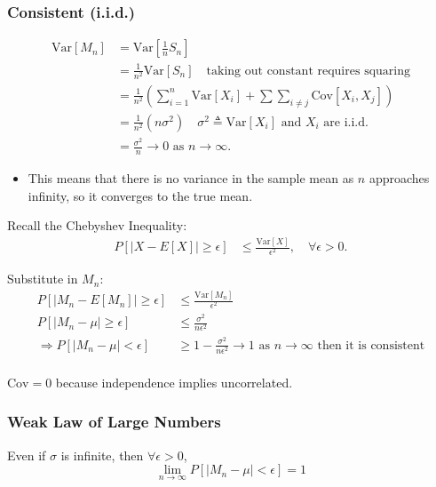 \subsubsection{Consistent (i.i.d.)}
\begin{derivation}
    \begin{align*}
        \text{Var}[M_n] &= \text{Var}\left[\frac{1}{n} S_n\right] \\
        &= \frac{1}{n^2} \text{Var}[S_n] \quad \text{taking out constant requires squaring}\\
        &= \frac{1}{n^2} \left(\sum_{i=1}^n \text{Var}[X_i] + \sum \sum_{i \neq j} \text{Cov}[X_i, X_j]\right) \\
        &= \frac{1}{n^2} (n \sigma^2) \quad \sigma^2 \triangleq \text{Var}[X_i] \text{ and $X_i$ are i.i.d.} \\
        &= \frac{\sigma^2}{n} \to 0 \text{ as } n \to \infty.
    \end{align*}
    \begin{itemize}
        \item This means that there is no variance in the sample mean as $n$ approaches infinity, so it converges to the true mean.
    \end{itemize}
    \vspace{1em}

    Recall the Chebyshev Inequality:
    \begin{align*}
        P\left[|X - E[X]| \geq \epsilon\right] &\leq \frac{\text{Var}[X]}{\epsilon^2}, \quad \forall \epsilon > 0.
    \end{align*}

    Substitute in $M_n$:
    \begin{align*}
        P\left[|M_n - E[M_n]| \geq \epsilon\right] &\leq \frac{\text{Var}[M_n]}{\epsilon^2} \\
        P\left[|M_n - \mu| \geq \epsilon\right] &\leq \frac{\sigma^2}{n \epsilon^2} \\
        \Rightarrow P\left[|M_n - \mu| < \epsilon\right] &\geq 1 - \frac{\sigma^2}{n \epsilon^2} \to 1 \text{ as } n \to \infty \text{ then it is consistent} \\
    \end{align*}
\end{derivation}

\begin{warning}
    $\text{Cov} = 0$ because independence implies uncorrelated. 
\end{warning}

\subsubsection{Weak Law of Large Numbers}
\begin{definition}
    Even if $\sigma$ is infinite, then $\forall \epsilon > 0$, 
    \begin{equation*}
        \lim_{n \to \infty} P\left[|M_n - \mu| < \epsilon\right] = 1
    \end{equation*}
\end{definition}

